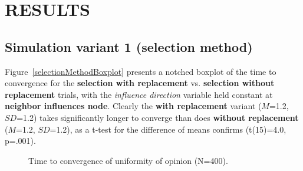 
\section{RESULTS}

\subsection{Simulation variant 1 (selection method)}

Figure~\ref{selectionMethodBoxplot} presents a notched boxplot of the time to
convergence for the \textbf{selection with replacement} vs. \textbf{selection
without replacement} trials, with the \textsl{influence direction} variable
held constant at \textbf{neighbor influences node}. Clearly the \textbf{with
replacement} variant ($M$=1.2, $SD$=1.2) takes significantly longer to
converge than does \textbf{without replacement} ($M$=1.2, $SD$=1.2), as a
t-test for the difference of means confirms (t(15)=4.0, p=.001).

\begin{figure}[!tbp]
  \centering
  \hfill
  \caption{Time to convergence of uniformity of opinion (N=400).}
\end{figure}



